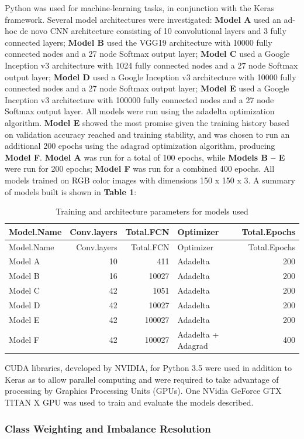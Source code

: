 \documentclass[12pt,]{article}
\begin{document}
Python was used for machine-learning tasks, in conjunction with the
Keras framework. Several model architectures were investigated:
\textbf{Model A} used an ad-hoc de novo CNN architecture consisting of
10 convolutional layers and 3 fully connected layers; \textbf{Model B}
used the VGG19 architecture with 10000 fully connected nodes and a 27
node Softmax output layer; \textbf{Model C} used a Google Inception v3
architecture with 1024 fully connected nodes and a 27 node Softmax
output layer; \textbf{Model D} used a Google Inception v3 architecture
with 10000 fully connected nodes and a 27 node Softmax output layer;
\textbf{Model E} used a Google Inception v3 architecture with 100000
fully connected nodes and a 27 node Softmax output layer. All models
were run using the adadelta optimization algorithm. \textbf{Model E}
showed the most promise given the training history based on validation
accuracy reached and training stability, and was chosen to run an
additional 200 epochs using the adagrad optimization algorithm,
producing \textbf{Model F}. \textbf{Model A} was run for a total of 100
epochs, while \textbf{Models B -- E} were run for 200 epochs;
\textbf{Model F} was run for a combined 400 epochs. All models trained
on RGB color images with dimensions 150 x 150 x 3. A summary of models
built is shown in \textbf{Table 1}:

\begin{longtable}[c]{@{}lrrlr@{}}
\caption{Training and architecture parameters for models
used}\tabularnewline
\toprule
Model.Name & Conv.layers & Total.FCN & Optimizer &
Total.Epochs\tabularnewline
\midrule
\endfirsthead
\toprule
Model.Name & Conv.layers & Total.FCN & Optimizer &
Total.Epochs\tabularnewline
\midrule
\endhead
Model A & 10 & 411 & Adadelta & 200\tabularnewline
Model B & 16 & 10027 & Adadelta & 200\tabularnewline
Model C & 42 & 1051 & Adadelta & 200\tabularnewline
Model D & 42 & 10027 & Adadelta & 200\tabularnewline
Model E & 42 & 100027 & Adadelta & 200\tabularnewline
Model F & 42 & 100027 & Adadelta + Adagrad & 400\tabularnewline
\bottomrule
\end{longtable}

CUDA libraries, developed by NVIDIA, for Python 3.5 were used in
addition to Keras as to allow parallel computing and were required to
take advantage of processing by Graphics Processing Units (GPUs). One
NVidia GeForce GTX TITAN X GPU was used to train and evaluate the models
described.

\subsubsection{Class Weighting and Imbalance
Resolution}\label{class-weighting-and-imbalance-resolution}
\end{document}
